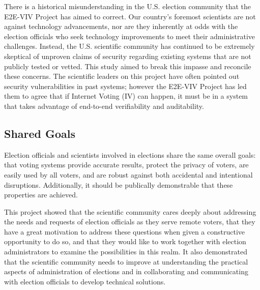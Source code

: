 There is a historical misunderstanding in the U.S. election community
that the E2E-VIV Project has aimed to correct. Our country's foremost
scientists are not against technology advancements, nor are they
inherently at odds with the election officials who seek technology
improvements to meet their administrative challenges. Instead, the
U.S. scientific community has continued to be extremely skeptical of unproven claims of
security regarding existing systems that are not publicly tested or
vetted. This study aimed to break this impasse and reconcile these
concerns. The scientific leaders on this project have often pointed out
security vulnerabilities in past systems; however the E2E-VIV Project
has led them to agree that if Internet Voting (IV) can happen, it must
be in a system that takes advantage of end-to-end verifiability and
auditability.


\subsection{Shared Goals}
\label{sec:shared-goals}

Election officials and scientists involved in elections share the same
overall goals: that voting systems provide accurate results, protect
the privacy of voters, are easily used by all voters, and are robust
against both accidental and intentional disruptions. Additionally, it
should be publically demonstrable that these properties are achieved.

This project showed that the scientific community cares deeply about
addressing the needs and requests of election officials as they serve
remote voters, that they have a great motivation to address these
questions when given a constructive opportunity to do so, and that
they would like to work together with election administrators to examine 
the possibilities in this realm. It also demonstrated that the scientific 
community needs to improve at understanding the practical aspects of 
administration of elections and in collaborating and communicating with 
election officials to develop technical solutions. 


